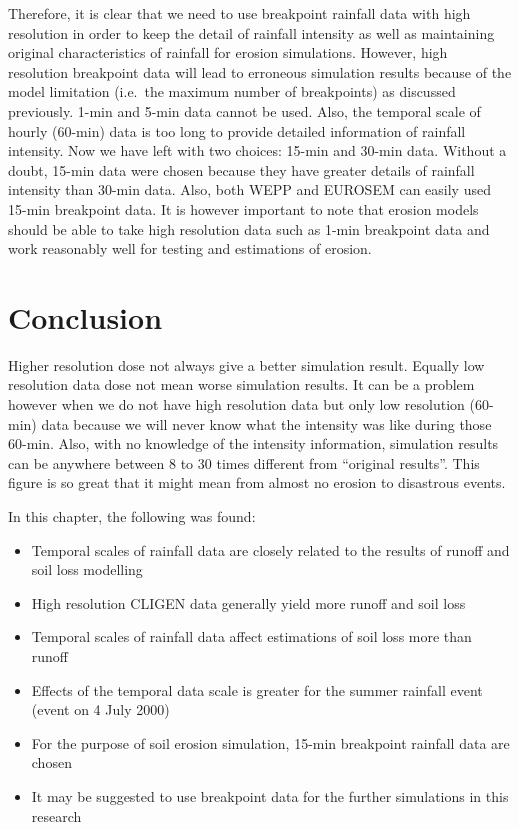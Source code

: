 Therefore, it is clear that we need to use breakpoint rainfall data with high
resolution in order to keep the detail of rainfall intensity as well as
maintaining original characteristics of rainfall for erosion simulations.
However, high resolution breakpoint data will lead to erroneous simulation
results because of the model limitation (i.e.\ the maximum number of
breakpoints) as discussed previously. 1-min and 5-min data cannot be used.
Also, the temporal scale of hourly (60-min) data is too long to provide
detailed information of rainfall intensity. Now we have left with two choices:
15-min and 30-min data. Without a doubt, 15-min data were chosen because they
have greater details of rainfall intensity than 30-min data. Also, both WEPP
and EUROSEM can easily used 15-min breakpoint data. It is however important to
note that erosion models should be able to take high resolution data such as
1-min breakpoint data and work reasonably well for testing and estimations of
erosion.

\section{Conclusion}
\label{sec:TemporalScalesConclusion}

Higher resolution dose not always give a better simulation result.
Equally low resolution data dose not mean worse simulation results. It can be a
problem however when we do not have high resolution data but only low resolution
(60-min) data because we will never know what the intensity was like during
those 60-min. Also, with no knowledge of the intensity information, simulation
results can be anywhere between 8 to 30 times different from ``original
results''. This figure is so great that it might mean from almost no erosion to
disastrous events.

In this chapter, the following was found:
\begin{itemize}
  \item Temporal scales of rainfall data are closely related to the results of
runoff and soil loss modelling
  \item High resolution CLIGEN data generally yield more runoff and soil loss
  \item Temporal scales of rainfall data affect estimations of soil loss more
than runoff
  \item Effects of the temporal data scale is greater for the summer rainfall
event (event on 4 July 2000)
  \item For the purpose of soil erosion simulation, 15-min breakpoint rainfall
data are chosen
  \item It may be suggested to use breakpoint data for the further simulations
in this research
\end{itemize}

